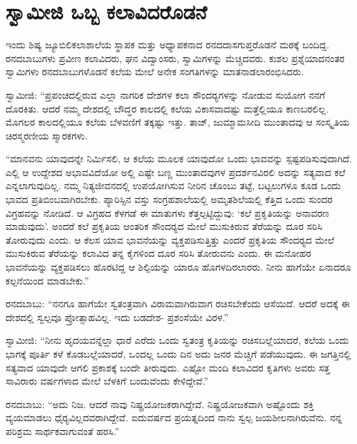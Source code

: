 
\chapter{ಸ್ವಾಮೀಜಿ ಒಬ್ಬ ಕಲಾವಿದರೊಡನೆ}

\vskip 3pt

 ಇಂದು ಶಿಷ್ಯ ಜ್ಯೂಬಿಲಿಕಲಾಶಾಲೆಯ ಸ್ಥಾಪಕ ಮತ್ತು ಅಧ್ಯಾಪಕನಾದ ರನದದಾಸಗುಪ್ತರೊಡನೆ ಮಠಕ್ಕೆ ಬಂದಿದ್ದ. ರನದಬಾಬುಗಳು ಪ್ರವೀಣ ಕಲಾವಿದರು, ಘನ ವಿದ್ವಾಂಸರು, ಸ್ವಾಮಿಗಳನ್ನು ಮೆಚ್ಚಿದವರು. ಕುಶಲ ಪ್ರಶ್ನೆಯಾದನಂತರ ಸ್ವಾಮಿಗಳು ರನದಬಾಬುಗಳೊಡನೆ ಕಲೆಯ ಮೇಲೆ ಅನೇಕ ಸಂಗತಿಗಳನ್ನು ಮಾತನಾಡಲಾರಂಭಿಸಿದರು. 

\vskip 3pt

 ಸ್ವಾಮೀಜಿ: “ಪ್ರಪಂಚದಲ್ಲಿರುವ ಎಲ್ಲಾ ನಾಗರಿಕ ದೇಶಗಳ ಕಲಾ ಸೌಂದರ‍್ಯಗಳನ್ನು ನೋಡುವ ಸುಯೋಗ ನನಗೆ ದೊರಕಿತು. ಆದರೆ ನಮ್ಮ ದೇಶದಲ್ಲಿ ಬೌದ್ಧರ ಕಾಲದಲ್ಲಿ ಕಲೆಯ ವಿಕಾಸವಾದಷ್ಟು ಮತ್ತೆಲ್ಲಿಯೂ ಕಾಣಬರಲಿಲ್ಲ. ಮೊಗಲರ ಕಾಲದಲ್ಲಿಯೂ ಕಲೆಯ ಬೆಳವಣಿಗೆ ತಕ್ಕಷ್ಟು ಇತ್ತು. ತಾಜ್, ಜುಮ್ಮಾಮಸೀದಿ ಮುಂತಾದವು ಆ ಸಂಸ್ಕೃತಿಯ ಚಿರಸ್ಮರಣೀಯ ಸ್ಮಾರಕಗಳು.

\vskip 3pt

 “ಮಾನವನು ಯಾವುದನ್ನೇ ನಿರ್ಮಿಸಲಿ, ಆ ಕಲೆಯ ಮೂಲಕ ಯಾವುದೋ ಒಂದು ಭಾವವನ್ನು ಸ್ಪಷ್ಟಪಡಿಸುವುದಾಗಿದೆ. ಎಲ್ಲಿ ಆ ಉದ್ದೇಶದ ಅಭಾವವಿದೆಯೋ ಅಲ್ಲಿ ಎಷ್ಟೇ ಬಣ್ಣ ಮುಂತಾದವುಗಳ ಪ್ರದರ್ಶನವಿರಲಿ ಅದನ್ನು ಸತ್ಯವಾದ ಕಲೆ ಎನ್ನಲಾಗುವುದಿಲ್ಲ. ನಮ್ಮ ನಿತ್ಯಜೀವನದಲ್ಲಿ ಉಪಯೋಗಿಸುವ ನೀರಿನ ಚೊಂಬು ತಟ್ಟೆ, ಬಟ್ಟಲುಗಳೂ ಕೂಡ ಒಂದು ಭಾವದ ಪ್ರತಿಬಿಂಬವಾಗಿರಬೇಕು. ಪ್ಯಾರಿಸ್ಸಿನ ವಸ್ತು ಸಂಗ್ರಹಶಾಲೆಯಲ್ಲಿ ಅಮೃತಶಿಲೆಯಲ್ಲಿ ಕೆತ್ತಿದ ಒಂದು ಸುಂದರ ವಿಗ್ರಹವನ್ನು ನೋಡಿದೆ. ಆ ವಿಗ್ರಹದ ಕೆಳಗಡೆ ಈ ಮಾತುಗಳು ಕೆತ್ತಲ್ಪಟ್ಟಿದ್ದುವು: ‘ಕಲೆ ಪ್ರಕೃತಿಯನ್ನು ಅನಾವರಣ ಮಾಡುವುದು’. ಅಂದರೆ ಕಲೆ ಪ್ರಕೃತಿಯ ಆಂತರಿಕ ಸೌಂದರ‍್ಯದ ಮೇಲೆ ಮುಸುಕಿರುವ ತೆರೆಯನ್ನು ದೂರ ಸರಿಸಿ ತೋರುವುದು ಎಂದು. ಆ ಕೆಲಸ ಯಾವ ಭಾವನೆಯನ್ನು ವ್ಯಕ್ತಪಡಿಸುತ್ತಿತ್ತು ಎಂದರೆ ಪ್ರಕೃತಿಯ ಸೌಂದರ‍್ಯದ ಮೇಲೆ ಮುಸುಕಿರುವ ತೆರೆಯನ್ನು ಕಲಾವಿದ ತನ್ನ ಕೈಗಳಿಂದ ದೂರ ಸರಿಸಿ ತೋರುವನು ಎಂದು. ಈ ಮನೋಹರ ಭಾವನೆಯನ್ನು ವ್ಯಕ್ತಪಡಿಸಲು ಹೊರಟಿದ್ದ ಆ ಶಿಲ್ಪಿಯನ್ನು ಯಾರೂ ಹೊಗಳದಿರಲಾರರು. ನೀನು ಹಾಗೆಯೇ ಏನಾದರೂ ಕಲ್ಪನೆಯಿಂದ ಮಾಡಬೇಕು.” 

 ರನದಬಾಬು: “ನನಗೂ ಹಾಗೆಯೇ ಸ್ವತಂತ್ರವಾಗಿ ವಿರಾಮವಾಗಿರುವಾಗ ರಚಿಸಬೇಕೆಂದು ಆಸೆಯಿದೆ. ಆದರೆ ಅದಕ್ಕೆ ಈ ದೇಶದಲ್ಲಿ ಸ್ವಲ್ಪವೂ ಪ್ರೋತ್ಸಾಹವಿಲ್ಲ. ಇದು ಬಡದೇಶ- ಪ್ರಶಂಸೆಯೇ ವಿರಳ.” 

 ಸ್ವಾಮೀಜಿ: “ನೀನು ಹೃದಯವನ್ನೆಲ್ಲಾ ಧಾರೆ ಎರೆದು ಒಂದು ಸ್ವತಂತ್ರ ಕೃತಿಯನ್ನು ರಚಿಸಬಲ್ಲೆಯಾದರೆ, ಕಲೆಯ ಒಂದು ಭಾಗಕ್ಕೆ ಪೂರ್ತಿ ಕಳೆ ಕೊಡಬಲ್ಲೆಯಾದರೆ, ಒಂದಲ್ಲ ಒಂದು ದಿನ ಅದು ಜನರ ಮೆಚ್ಚಿಗೆ ಪಡೆಯುವುದು. ಈ ಜಗತ್ತಿನಲ್ಲಿ ಸತ್ಯವಾದ ಯಾವುದೇ ಆಗಲಿ ಪ್ರಕಾಶಕ್ಕೆ ಬಂದೇ ತೀರುವುದು. ಎಷ್ಟೋ ಮಂದಿ ಕಲಾವಿದರ ಕೃತಿಗಳು ಅವರು ಸತ್ತ ಸಾವಿರಾರು ವರ್ಷಗಳಾದ ಮೇಲೆ ಬೆಳಕಿಗೆ ಬಂದುವೆಂದು ಕೇಳಿದ್ದೇವೆ.” 

 ರನದಬಾಬು: “ಅದು ನಿಜ. ಆದರೆ ನಾವು ನಿಷ್ಪ್ರಯೋಜಕರಾಗಿದ್ದೇವೆ. ನಿಷ್ಪ್ರಯೋಜಕವಾಗಿ ಅಷ್ಟೊಂದು ಶಕ್ತಿ ವ್ಯಯಮಾಡಲು ಧೈರ‍್ಯವಿಲ್ಲದವರಾಗಿದ್ದೇವೆ. ಐದುವರ್ಷದ ಪ್ರಯತ್ನದಿಂದ ನಾನು ಸ್ವಲ್ಪ ಜಯಶೀಲನಾಗಿರುವೆನು. ನನ್ನ ಪರಿಶ್ರಮ ಸಾರ್ಥಕವಾಗುವಂತೆ ಹರಸಿ.” 

